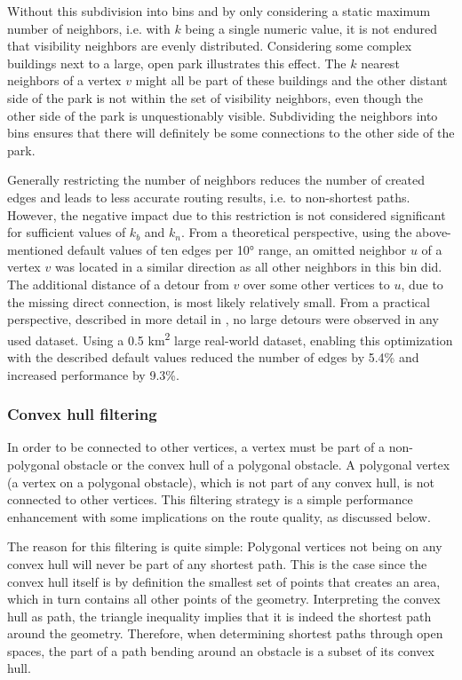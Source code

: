 			Without this subdivision into bins and by only considering a static maximum number of neighbors, i.e. with $k$ being a single numeric value, it is not endured that visibility neighbors are evenly distributed.
			Considering some complex buildings next to a large, open park illustrates this effect.
			The $k$ nearest neighbors of a vertex $v$ might all be part of these buildings and the other distant side of the park is not within the set of visibility neighbors, even though the other side of the park is unquestionably visible.
			Subdividing the neighbors into bins ensures that there will definitely be some connections to the other side of the park.
			
			Generally restricting the number of neighbors reduces the number of created edges and leads to less accurate routing results, i.e. to non-shortest paths.
			However, the negative impact due to this restriction is not considered significant for sufficient values of $k_b$ and $k_n$.
			From a theoretical perspective, using the above-mentioned default values of ten edges per 10° range, an omitted neighbor $u$ of a vertex $v$ was located in a similar direction as all other neighbors in this bin did.
			The additional distance of a detour from $v$ over some other vertices to $u$, due to the missing direct connection, is most likely relatively small.
			From a practical perspective, described in more detail in , no large detours were observed in any used dataset.
			Using a 0.5 km\textsuperscript{2} large real-world dataset, enabling this optimization with the described default values reduced the number of edges by 5.4\% and increased performance by 9.3\%.
			
		\subsubsection{Convex hull filtering}
		\label{subsubsec:convex-hull}
			
			In order to be connected to other vertices, a vertex must be part of a non-polygonal obstacle or the convex hull of a polygonal obstacle.
			A polygonal vertex (a vertex on a polygonal obstacle), which is not part of any convex hull, is not connected to other vertices.
			This filtering strategy is a simple performance enhancement with some implications on the route quality, as discussed below.
			
			The reason for this filtering is quite simple:
			Polygonal vertices not being on any convex hull will never be part of any shortest path.
			This is the case since the convex hull itself is by definition the smallest set of points that creates an area, which in turn contains all other points of the geometry\cite[2]{de-berg-computational-geometry}.
			Interpreting the convex hull as path, the triangle inequality implies that it is indeed the shortest path around the geometry.
			Therefore, when determining shortest paths through open spaces, the part of a path bending around an obstacle is a subset of its convex hull.
			
